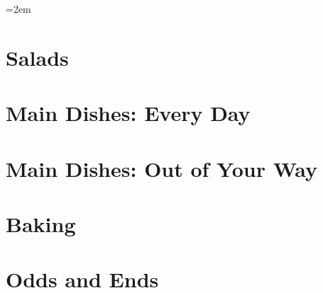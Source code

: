 \documentclass[landscape,12pt,openany]{book}
\begin{document}
\rmfamily

\setlength{\columnseprule}{0pt}
\columnsep=2em

\setcounter{tocdepth}{1}
\small
\tableofcontents

\normalsize

\setlength{\parskip}{.5em}

\chapter{Salads}











\chapter{Main Dishes: Every Day}

























\chapter{Main Dishes: Out of Your Way}






\chapter{Baking}






\chapter{Odds and Ends}







\end{document}
